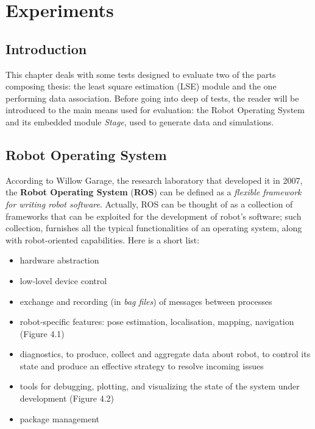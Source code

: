 \documentclass[a4paper, onecolumn]{report}
\begin{document}
\chapter{Experiments}
\section{Introduction}
This chapter deals with some tests designed to evaluate two of the parts composing thesis: the least square estimation (LSE) module and the one performing data association. Before going into deep of tests, the reader will be introduced to the main means used for evaluation: the Robot Operating System and its embedded module \emph{Stage}, used to generate data and simulations.

\section{Robot Operating System}
According to Willow Garage, the research laboratory that developed it in 2007, the \textbf{Robot Operating System} (\textbf{ROS}) can be defined as a \emph{flexible framework for writing robot software}. Actually, ROS can be thought of as a collection of frameworks that can be exploited for the development of robot's software; such collection, furnishes all the typical functionalities of an operating system,  along with robot-oriented capabilities. Here is a short list:
\begin{itemize}
	\item{hardware abstraction}
	\item{low-lovel device control}
	\item{exchange and recording (in \emph{bag files}) of messages between processes}
	\item{robot-specific features: pose estimation, localisation, mapping, navigation (Figure 4.1)}
	\item{diagnostics, to produce, collect and aggregate data about robot, to control its state and produce an effective strategy to resolve incoming issues}
	\item{tools for debugging, plotting, and visualizing the state of the system under development (Figure 4.2)}
	\item{package management}
\end{itemize}
\end{document}
